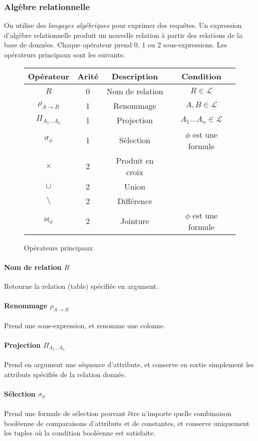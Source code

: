 \documentclass[french, toc]{../cs-classes/cs-classes}
\renewcommand*{\L}{\mathcal{L}}
\begin{document}
\subsubsection{Algèbre relationnelle}
On utilise des \emph{langages algébriques} pour exprimer des requêtes. Un expression d'algèbre relationnelle produit un nouvelle relation à partir des relations de la base de données. Chaque opérateur prend 0, 1 ou 2 sous-expressions. Les opérateurs principaux sont les suivants:
\begin{figure}[!ht]
    \centering
    \begin{tabular}{c c c c}
        Opérateur & Arité & Description & Condition \\
        \hline
        $R$ & 0 & Nom de relation & $R\in\L$\\
        $\rho_{A\to B}$ & 1 & Renommage & $A, B\in \L$\\
        $\Pi_{A_1\dots A_n}$ & 1 & Projection & $A_1\dots A_n\in\L$\\
        $\sigma_\phi$ & 1 & Sélection & $\phi$ est une formule\\
        $\times$ & 2 & Produit en croix &\\
        $\cup$ & 2 & Union&\\
        $\setminus$&2&Différence&\\
        $\bowtie_\phi$&2&Jointure&$\phi$ est une formule
    \end{tabular}
    \caption{Opérateurs principaux}
\end{figure}

\paragraph*{Nom de relation $R$}
Retourne la relation (table) spécifiée en argument.
\paragraph*{Renommage $\rho_{A\to B}$}
Prend une sous-expression, et renomme une colonne.
\paragraph*{Projection $\Pi_{A_1\dots A_n}$}
Prend en argument une séquence d'attributs, et conserve en sortie simplement les attributs spécifiés de la relation donnée.
\paragraph*{Sélection $\sigma_\phi$}
Prend une formule de sélection pouvant être n'importe quelle combinaison booléenne de comparaisons d'attributs et de constantes, et conserve uniquement les tuples où la condition booléenne est satisfaite.
\end{document}
